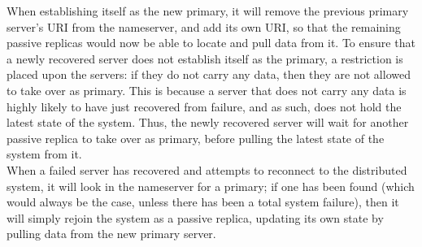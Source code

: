 \documentclass[11pt]{article}
\begin{document}
When establishing itself as the new primary, it will remove the previous 
primary server's URI from the nameserver, and add its own URI, so that the 
remaining passive replicas would now be able to locate and pull data from it. 
To ensure that a newly recovered server does not establish itself as the 
primary, a restriction is placed upon the servers: if they do not carry any 
data, then they are not allowed to take over as primary. This is because a 
server that does not carry any data is highly likely to have just recovered from 
failure, and as such, does not hold the latest state of the system. Thus, the
newly recovered server will wait for another passive replica to take over 
as primary, before pulling the latest state of the system from it.\\

When a failed server has recovered and attempts to reconnect to the 
distributed system, it will look in the nameserver for a primary; 
if one has been found (which would always be the case, unless there has been a 
total system failure), then it will simply rejoin the system as a passive 
replica, updating its own state by pulling data from the new primary server.
\end{document}

